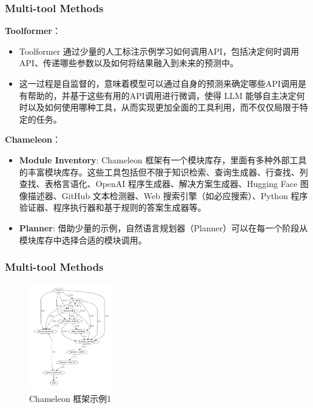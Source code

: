 \begin{frame}
	\frametitle{Multi-tool Methods}
	\begin{small}
		\textbf{Toolformer}：
		\begin{itemize}
			\item Toolformer 通过少量的人工标注示例学习如何调用API，包括决定何时调用API、传递哪些参数以及如何将结果融入到未来的预测中。
			\item 这一过程是自监督的，意味着模型可以通过自身的预测来确定哪些API调用是有帮助的，并基于这些有用的API调用进行微调，使得 LLM 能够自主决定何时以及如何使用哪种工具，从而实现更加全面的工具利用，而不仅仅局限于特定的任务。
		\end{itemize}

		\pause

		\textbf{Chameleon}：
		\begin{itemize}
			\item \textbf{Module Inventory}: Chameleon 框架有一个模块库存，里面有多种外部工具的丰富模块库存。这些工具包括但不限于知识检索、查询生成器、行查找、列查找、表格言语化、OpenAI 程序生成器、解决方案生成器、Hugging Face 图像描述器、GitHub 文本检测器、Web 搜索引擎（如必应搜索）、Python 程序验证器、程序执行器和基于规则的答案生成器等。
			\item \textbf{Planner}: 借助少量的示例，自然语言规划器（Planner）可以在每一个阶段从模块库存中选择合适的模块调用。
		\end{itemize}
	\end{small}
\end{frame}

\begin{frame}
	\frametitle{Multi-tool Methods}
	\begin{figure}[h]
		\centering
		\includegraphics[width=0.33\textwidth]{pic/tabmwp-gpt4.pdf}
		\caption{Chameleon 框架示例1}
		\label{fig:transition_tabmwp}
	\end{figure}
\end{frame}

